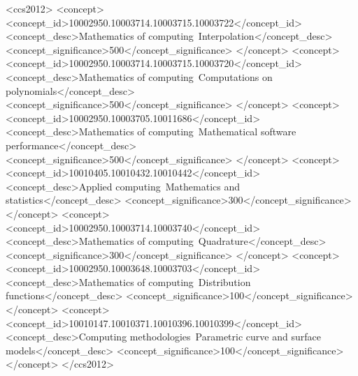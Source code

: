 \documentclass[manuscript]{acmart}
\begin{document}
\begin{CCSXML}
<ccs2012>
<concept>
<concept_id>10002950.10003714.10003715.10003722</concept_id>
<concept_desc>Mathematics of computing~Interpolation</concept_desc>
<concept_significance>500</concept_significance>
</concept>
<concept>
<concept_id>10002950.10003714.10003715.10003720</concept_id>
<concept_desc>Mathematics of computing~Computations on polynomials</concept_desc>
<concept_significance>500</concept_significance>
</concept>
<concept>
<concept_id>10002950.10003705.10011686</concept_id>
<concept_desc>Mathematics of computing~Mathematical software performance</concept_desc>
<concept_significance>500</concept_significance>
</concept>
<concept>
<concept_id>10010405.10010432.10010442</concept_id>
<concept_desc>Applied computing~Mathematics and statistics</concept_desc>
<concept_significance>300</concept_significance>
</concept>
<concept>
<concept_id>10002950.10003714.10003740</concept_id>
<concept_desc>Mathematics of computing~Quadrature</concept_desc>
<concept_significance>300</concept_significance>
</concept>
<concept>
<concept_id>10002950.10003648.10003703</concept_id>
<concept_desc>Mathematics of computing~Distribution functions</concept_desc>
<concept_significance>100</concept_significance>
</concept>
<concept>
<concept_id>10010147.10010371.10010396.10010399</concept_id>
<concept_desc>Computing methodologies~Parametric curve and surface models</concept_desc>
<concept_significance>100</concept_significance>
</concept>
</ccs2012>
\end{CCSXML}



\maketitle
\end{document}
